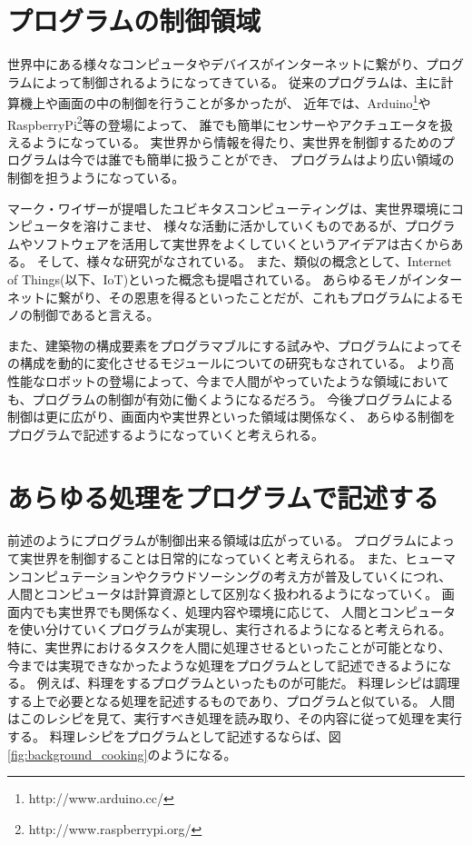 \section{プログラムの制御領域}\label{ux30d7ux30edux30b0ux30e9ux30e0ux306eux5236ux5fa1ux9818ux57df}

世界中にある様々なコンピュータやデバイスがインターネットに繋がり、プログラムによって制御されるようになってきている。
従来のプログラムは、主に計算機上や画面の中の制御を行うことが多かったが、
近年では、Arduino\footnote{http://www.arduino.cc/}やRaspberryPi\footnote{http://www.raspberrypi.org/}等の登場によって、
誰でも簡単にセンサーやアクチュエータを扱えるようになっている。
実世界から情報を得たり、実世界を制御するためのプログラムは今では誰でも簡単に扱うことができ、
プログラムはより広い領域の制御を担うようになっている。

マーク・ワイザーが提唱したユビキタスコンピューティング\cite{weiser1991computer}は、実世界環境にコンピュータを溶けこませ、
様々な活動に活かしていくものであるが、プログラムやソフトウェアを活用して実世界をよくしていくというアイデアは古くからある。
そして、様々な研究がなされている。 また、類似の概念として、Internet of
Things(以下、IoT)\cite{iot}といった概念も提唱されている。
あらゆるモノがインターネットに繋がり、その恩恵を得るといったことだが、これもプログラムによるモノの制御であると言える。

また、建築物の構成要素をプログラマブルにする試み\cite{squama}や、プログラムによってその構成を動的に変化させるモジュールについての研究もなされている。
より高性能なロボットの登場によって、今まで人間がやっていたような領域においても、プログラムの制御が有効に働くようになるだろう。
今後プログラムによる制御は更に広がり、画面内や実世界といった領域は関係なく、
あらゆる制御をプログラムで記述するようになっていくと考えられる。

\section{あらゆる処理をプログラムで記述する}\label{ux3042ux3089ux3086ux308bux51e6ux7406ux3092ux30d7ux30edux30b0ux30e9ux30e0ux3067ux8a18ux8ff0ux3059ux308b}

前述のようにプログラムが制御出来る領域は広がっている。
プログラムによって実世界を制御することは日常的になっていくと考えられる。
また、ヒューマンコンピュテーションやクラウドソーシングの考え方が普及していくにつれ、
人間とコンピュータは計算資源として区別なく扱われるようになっていく。
画面内でも実世界でも関係なく、処理内容や環境に応じて、
人間とコンピュータを使い分けていくプログラムが実現し、実行されるようになると考えられる。
特に、実世界におけるタスクを人間に処理させるといったことが可能となり、
今までは実現できなかったような処理をプログラムとして記述できるようになる。
例えば、料理をするプログラムといったものが可能だ。
料理レシピは調理する上で必要となる処理を記述するものであり、プログラムと似ている。
人間はこのレシピを見て、実行すべき処理を読み取り、その内容に従って処理を実行する。
料理レシピをプログラムとして記述するならば、図\ref{fig:background_cooking}のようになる。


